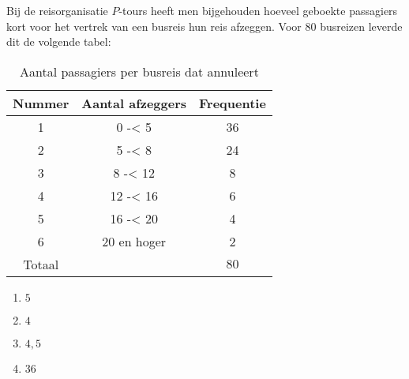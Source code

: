 Bij de reisorganisatie $P$-tours heeft men bijgehouden hoeveel geboekte passagiers kort voor het vertrek van een busreis hun reis afzeggen.
Voor 80 busreizen leverde dit de volgende tabel:

\begin{table}[h!]
    \centering
    \caption*{Aantal passagiers per busreis dat annuleert}
    \begin{tabular}{ccc}
        \toprule
            {\bfseries Nummer} & {\bfseries Aantal afzeggers} & {\bfseries Frequentie} \\
        \midrule
            1 & 0 -< 5 & 36 \\
            2 & 5 -< 8 & 24 \\
            3 & 8 -< 12 & 8 \\
            4 & 12 -< 16 & 6 \\
            5 & 16 -< 20 & 4 \\
            6 & 20 en hoger & 2 \\
        \midrule    
            Totaal & & $80$ \\
        \bottomrule
    \end{tabular}
\end{table}

\begin{enumerate}[label=(\alph*)]
    \item $5$
    \item $4$
    \item $4,5$
    \item $36$
\end{enumerate}

